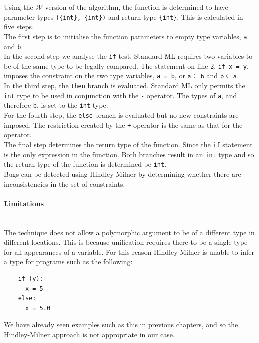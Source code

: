 \documentclass[12pt, titlepage]{article}
\begin{document}
Using the $\mathcal{W}$ version of the algorithm, the function is determined to have parameter types \texttt{(\{int\}, \{int\})} and return type \texttt{\{int\}}. This is calculated in five steps. \\
\indent The first step is to initialise the function parameters to empty type variables, \texttt{a} and \texttt{b}. \\
\indent In the second step we analyse the \texttt{if} test. Standard ML requires two variables to be of the same type to be legally compared. The statement on line 2, \texttt{if x = y}, imposes the constraint on the two type variables, \texttt{a = b}, or $\mathtt{a \subseteq b}$ and $\mathtt{b \subseteq a}$. \\
\indent In the third step, the \texttt{then} branch is evaluated. Standard ML only permits the \texttt{int} type to be used in conjunction with the \texttt{-} operator. The types of \texttt{a}, and therefore \texttt{b}, is set to the \texttt{int} type. \\
\indent For the fourth step, the \texttt{else} branch is evaluated but no new constraints are imposed. The restriction created by the \texttt{+} operator is the same as that for the \texttt{-} operator. \\
\indent The final step determines the return type of the function. Since the \texttt{if} statement is the only expression in the function. Both branches result in an \texttt{int} type and so the return type of the function is determined be \texttt{int}. \\
\indent Bugs can be detected using Hindley-Milner by determining whether there are inconsistencies in the set of constraints.

\paragraph{Limitations}\mbox{}\\
The technique does not allow a polymorphic argument to be of a different type in different locations. This is because unification requires there to be a single type for all appearances of a variable. For this reason Hindley-Milner is unable to infer a type for programs such as the following:
\begin{lstlisting}
	if (y):	
	  x = 5     
	else:
	  x = 5.0   
\end{lstlisting}
We have already seen examples such as this in previous chapters, and so the Hindley-Milner approach is not appropriate in our case.
\end{document}
